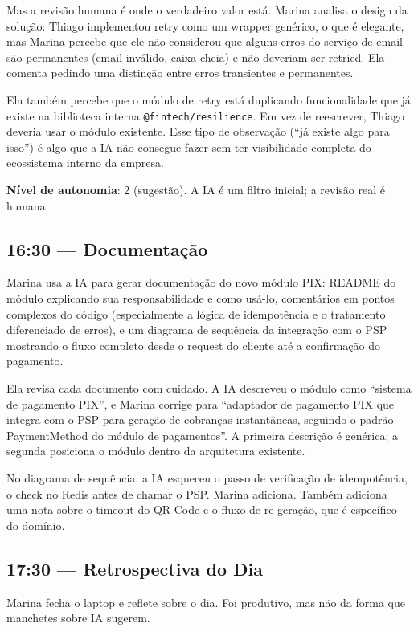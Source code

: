 Mas a revisão humana é onde o verdadeiro valor está. Marina analisa o design da
solução: Thiago implementou retry como um wrapper genérico, o que é elegante, mas
Marina percebe que ele não considerou que alguns erros do serviço de email são
permanentes (email inválido, caixa cheia) e não deveriam ser retried. Ela comenta
pedindo uma distinção entre erros transientes e permanentes.

Ela também percebe que o módulo de retry está duplicando funcionalidade que já existe
na biblioteca interna \texttt{@fintech/resilience}. Em vez de reescrever, Thiago
deveria usar o módulo existente. Esse tipo de observação (``já existe algo para
isso'') é algo que a IA não consegue fazer sem ter visibilidade completa do
ecossistema interno da empresa.

\textbf{Nível de autonomia}: 2 (sugestão). A IA é um filtro inicial; a
revisão real é humana.

\subsection{16:30 --- Documentação}

Marina usa a IA para gerar documentação do novo módulo PIX: README do
módulo explicando sua responsabilidade e como usá-lo, comentários em pontos
complexos do código (especialmente a lógica de idempotência e o tratamento
diferenciado de erros), e um diagrama de sequência da integração com o PSP
mostrando o fluxo completo desde o request do cliente até a confirmação do
pagamento.

Ela revisa cada documento com cuidado. A IA descreveu o módulo como ``sistema de
pagamento PIX'', e Marina corrige para ``adaptador de pagamento PIX que integra com o
PSP para geração de cobranças instantâneas, seguindo o padrão PaymentMethod do módulo
de pagamentos''. A primeira descrição é genérica; a segunda posiciona o módulo dentro
da arquitetura existente.

No diagrama de sequência, a IA esqueceu o passo de verificação de idempotência, o
check no Redis antes de chamar o PSP. Marina adiciona. Também adiciona uma nota sobre
o timeout do QR Code e o fluxo de re-geração, que é específico do domínio.

\subsection{17:30 --- Retrospectiva do Dia}

Marina fecha o laptop e reflete sobre o dia. Foi produtivo, mas não da forma que
manchetes sobre IA sugerem.

